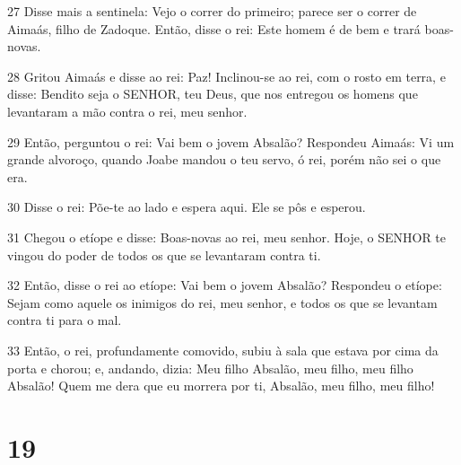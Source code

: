 \par 27 Disse mais a sentinela: Vejo o correr do primeiro; parece ser o correr de Aimaás, filho de Zadoque. Então, disse o rei: Este homem é de bem e trará boas-novas.
\par 28 Gritou Aimaás e disse ao rei: Paz! Inclinou-se ao rei, com o rosto em terra, e disse: Bendito seja o SENHOR, teu Deus, que nos entregou os homens que levantaram a mão contra o rei, meu senhor.
\par 29 Então, perguntou o rei: Vai bem o jovem Absalão? Respondeu Aimaás: Vi um grande alvoroço, quando Joabe mandou o teu servo, ó rei, porém não sei o que era.
\par 30 Disse o rei: Põe-te ao lado e espera aqui. Ele se pôs e esperou.
\par 31 Chegou o etíope e disse: Boas-novas ao rei, meu senhor. Hoje, o SENHOR te vingou do poder de todos os que se levantaram contra ti.
\par 32 Então, disse o rei ao etíope: Vai bem o jovem Absalão? Respondeu o etíope: Sejam como aquele os inimigos do rei, meu senhor, e todos os que se levantam contra ti para o mal.
\par 33 Então, o rei, profundamente comovido, subiu à sala que estava por cima da porta e chorou; e, andando, dizia: Meu filho Absalão, meu filho, meu filho Absalão! Quem me dera que eu morrera por ti, Absalão, meu filho, meu filho!

\chapter{19}

